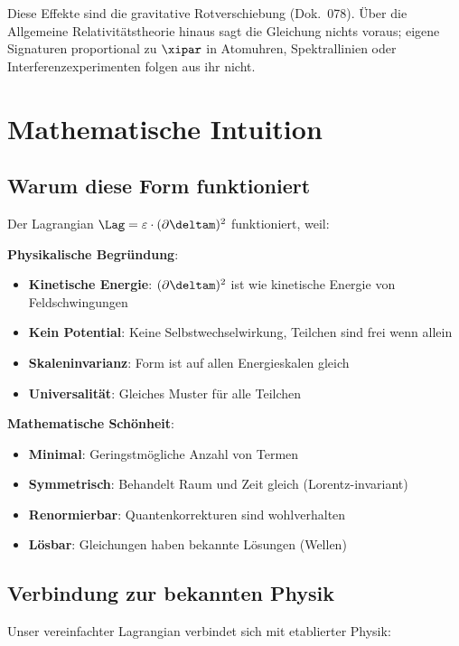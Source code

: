 	Diese Effekte sind die gravitative Rotverschiebung (Dok.~078). Über die Allgemeine Relativitätstheorie hinaus sagt die Gleichung nichts voraus; eigene Signaturen proportional zu $\xipar$ in Atomuhren, Spektrallinien oder Interferenzexperimenten folgen aus ihr nicht.

	\section{Mathematische Intuition}
	
	\subsection{Warum diese Form funktioniert}
	
	Der Lagrangian $\Lag = \varepsilon \cdot (\partial \deltam)^2$ funktioniert, weil:
	
	\textbf{Physikalische Begründung}:
	\begin{itemize}
		\item \textbf{Kinetische Energie}: $(\partial \deltam)^2$ ist wie kinetische Energie von Feldschwingungen
		\item \textbf{Kein Potential}: Keine Selbstwechselwirkung, Teilchen sind frei wenn allein
		\item \textbf{Skaleninvarianz}: Form ist auf allen Energieskalen gleich
		\item \textbf{Universalität}: Gleiches Muster für alle Teilchen
	\end{itemize}
	
	\textbf{Mathematische Schönheit}:
	\begin{itemize}
		\item \textbf{Minimal}: Geringstmögliche Anzahl von Termen
		\item \textbf{Symmetrisch}: Behandelt Raum und Zeit gleich (Lorentz-invariant)
		\item \textbf{Renormierbar}: Quantenkorrekturen sind wohlverhalten
		\item \textbf{Lösbar}: Gleichungen haben bekannte Lösungen (Wellen)
	\end{itemize}
	
	\subsection{Verbindung zur bekannten Physik}
	
	Unser vereinfachter Lagrangian verbindet sich mit etablierter Physik:
	
